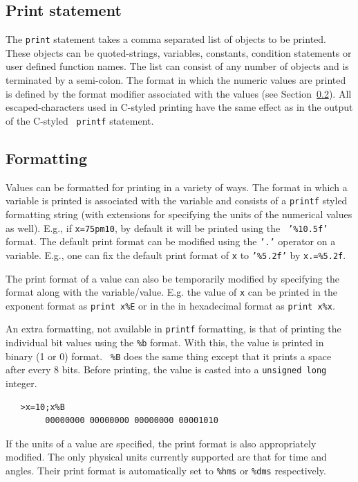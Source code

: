 \documentclass[acmtoms,acmnow]{acmtrans2m}
\begin{document}
\subsection{Print statement}
\label{PRINT}

The {\tt print} statement takes a comma separated list of objects to
be printed.  These objects can be quoted-strings, variables,
constants, condition statements or user defined function names.  The
list can consist of any number of objects and is terminated by a
semi-colon.  The format in which the numeric values are printed is
defined by the format modifier associated with the values (see
Section~\ref{FORMATTING}).  All escaped-characters used in C-styled
printing have the same effect as in the output of the C-styled {\tt
printf} statement.

\subsection{Formatting}
\label{FORMATTING}

Values can be formatted for printing in a variety of ways.  The format
in which a variable is printed is associated with the variable and
consists of a {\tt printf} styled formatting string (with extensions
for specifying the units of the numerical values as well).  E.g., if
{\tt x=75pm10}, by default it will be printed using the {\tt
'\%10.5f'} format.  The default print format can be modified using the
{\tt '.'} operator on a variable.  E.g., one can fix the default print
format of {\tt x} to {\tt '\%5.2f'} by {\tt x.=\%5.2f}.

The print format of a value can also be temporarily modified by
specifying the format along with the variable/value.  E.g. the value
of {\tt x} can be printed in the exponent format as {\tt print x\%E}
or in the in hexadecimal format as {\tt print x\%x}.

An extra formatting, not available in {\tt printf} formatting, is that
of printing the individual bit values using the {\tt \%b} format.
With this, the value is printed in binary (1 or 0) format.  {\tt
\%B} does the same thing except that it prints a space after every 8 bits.
Before printing, the value is casted into a {\tt unsigned long}
integer.
\begin{verbatim}
   >x=10;x%B
        00000000 00000000 00000000 00001010
\end{verbatim}
If the units of a value are specified, the print format is also
appropriately modified.  The only physical units currently supported
are that for time and angles.  Their print format is automatically set
to {\tt \%hms} or {\tt \%dms} respectively.
\end{document}
